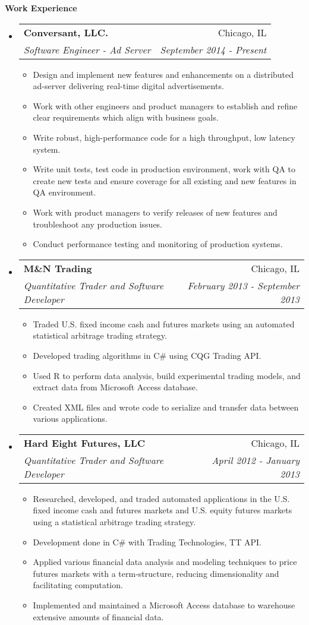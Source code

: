\documentclass[letterpaper,11pt]{article}
\makeatletter
\newcommand{\resitem}[1]{\item #1 \vspace{-2pt}}
\newcommand{\resheading}[1]{{\large \colorbox{mygrey}{\begin{minipage}{\textwidth}{\textbf{#1 \vphantom{p\^{E}}}}\end{minipage}}}}
\newcommand{\ressubheading}[4]{
\begin{tabular*}{7.0in}{l@{\extracolsep{\fill}}r}
		\textbf{#1} & #2 \\
		\textit{#3} & \textit{#4} \\
\end{tabular*}\vspace{-6pt}}
\makeatother
\begin{document}
\resheading{Work Experience}
\begin{itemize}
\item
	\ressubheading{Conversant, LLC.}{Chicago, IL}{Software Engineer - Ad Server}{September 2014 - Present}
	\begin{itemize}
		\resitem{Design and implement new features and enhancements on a distributed ad-server delivering real-time digital advertisements.}
		\resitem{Work with other engineers and product managers to establish and refine clear requirements which align with business goals.}
		\resitem{Write robust, high-performance code for a high throughput, low latency system.}
		\resitem{Write unit tests, test code in production environment, work with QA to create new tests and ensure coverage for all existing and new features in QA environment.}
		\resitem{Work with product managers to verify releases of new features and troubleshoot any production issues.}
		\resitem{Conduct performance testing and monitoring of production systems.}
	\end{itemize}
\item
	\ressubheading{M\&N Trading}{Chicago, IL}{Quantitative Trader and Software Developer}{February 2013 - September 2013}
	\begin{itemize}
		\resitem{Traded U.S. fixed income cash and futures markets using an automated statistical arbitrage 
   trading strategy.}
		\resitem{Developed trading algorithms in C\# using CQG Trading API.}
		\resitem{Used R to perform data analysis, build experimental trading models, and extract data from 
   Microsoft Access database.}
		\resitem{Created XML files and wrote code to serialize and transfer data between various applications. }
	\end{itemize}
\item
	\ressubheading{Hard Eight Futures, LLC}{Chicago, IL}{Quantitative Trader and Software Developer}{April 2012 - January 2013}
	\begin{itemize}
		\resitem{Researched, developed, and traded automated applications in the U.S. fixed income cash and 
   futures markets and U.S. equity futures markets using a statistical arbitrage trading strategy.}
		\resitem{Development done in C\# with Trading Technologies, TT API.}
		\resitem{Applied various financial data analysis and modeling techniques to price futures markets with 
   a term-structure, reducing dimensionality and facilitating computation.}
        \resitem{Implemented and maintained a Microsoft Access database to warehouse extensive amounts of financial data.}
	\end{itemize}

\end{itemize}
\end{document}
